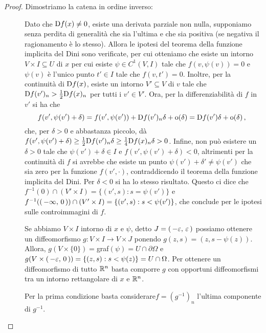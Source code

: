 \begin{proof}
	Dimostriamo la catena in ordine inverso:
	\begin{description}
		\item [] Dato che $\mathrm D f(x)\neq 0$, esiste una derivata parziale non nulla, supponiamo senza perdita
			di generalità che sia l'ultima e che sia positiva (se negativa il ragionamento è lo stesso).
			Allora le ipotesi del teorema della funzione implicita del Dini sono verificate, per cui otteniamo
			che esiste un intorno $V\times I\subseteq U$ di $x$ per cui esiste $\psi\in C^1(V,I)$ tale che $f(v,\psi(v))=0$ e $\psi(v)$
			è l'unico punto $t'\in I$ tale che $f(v,t')=0$.
			Inoltre, per la continuità di $\mathrm D f(x)$, esiste un intorno $V'\subseteq V$ di $v$ tale che $\mathrm D f(v')_n>\frac{1}{2}
			\mathrm D f(x)_n$ per tutti i $v'\in V'$. Ora, per la differenziabilità di $f$ in $v'$ si ha che
			\[
				f(v',\psi(v')+\delta)=f(v', \psi(v'))+\mathrm D f(v')_n\delta+\mathrm{o}(\delta)=\mathrm D f(v')\delta+\mathrm{o}(\delta)\, \text{, }
			\]
			che, per $\delta>0$ e abbastanza piccolo, dà $f(v',\psi(v')+\delta)\geq \frac{1}{2}\mathrm D f(v')_n\delta\geq \frac{1}{4}\mathrm D
			f(x)_n\delta>0$. Infine, non può esistere un $\delta>0$ tale che $\psi(v')+\delta\in I$ e
			$f(v',\psi(v')+\delta)<0$, altrimenti per la continuità di $f$ si avrebbe che esiste un punto $\psi(v')+\delta'\neq \psi(v')$
			che sia zero per la funzione $f(v',\cdot)$, contraddicendo il teorema della funzione implicita del Dini.
			Per $\delta<0$ si ha lo stesso risultato. Questo ci dice che $f^{-1}(0)\cap (V'\times I)=\{(v',s):s=\psi(v')\}$ e
			$f^{-1}(\left(\,-\infty,\,0\,\right))\cap (V'\times I)=\{(v',s):s<\psi(v')\}$, che conclude per le ipotesi sulle controimmagini di $f$.
		\item [] Se abbiamo $V\times I$ intorno di $x$ e $\psi$, detto $J=\left(\,-\varepsilon,\,\varepsilon\,\right)$
			possiamo ottenere un diffeomorfismo $g:V\times I \rightarrow V\times J$ ponendo $g(z,s)=(z,s-\psi(z))$. Allora,
			$g(V\times \{0\})=$graf$(\psi)=U\cap \partial \Omega$ e $g(V\times \left(\,-\varepsilon,\,0\,\right))=\{(z,s):s<\psi(z)\}=U\cap \Omega$.
			Per ottenere un diffeomorfismo di tutto $\mathbb R^n$ basta comporre $g$ con opportuni diffeomorfismi tra un intorno rettangolare
			di $x$ e $\mathbb R^n$.
		\item [] Per la prima condizione basta considerare$f=(g^{-1})_n$ l'ultima componente di $g^{-1}$.
	\end{description}
\end{proof}


